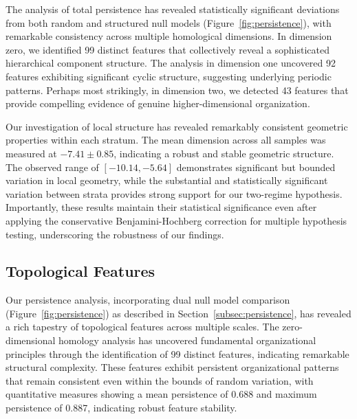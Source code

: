 The analysis of total persistence has revealed statistically significant deviations from both random and structured null models (Figure~\ref{fig:persistence}), with remarkable consistency across multiple homological dimensions. In dimension zero, we identified 99 distinct features that collectively reveal a sophisticated hierarchical component structure. The analysis in dimension one uncovered 92 features exhibiting significant cyclic structure, suggesting underlying periodic patterns. Perhaps most strikingly, in dimension two, we detected 43 features that provide compelling evidence of genuine higher-dimensional organization.

Our investigation of local structure has revealed remarkably consistent geometric properties within each stratum. The mean dimension across all samples was measured at $-7.41 \pm 0.85$, indicating a robust and stable geometric structure. The observed range of $[-10.14, -5.64]$ demonstrates significant but bounded variation in local geometry, while the substantial and statistically significant variation between strata provides strong support for our two-regime hypothesis. Importantly, these results maintain their statistical significance even after applying the conservative Benjamini-Hochberg correction for multiple hypothesis testing, underscoring the robustness of our findings.

\subsection{Topological Features}
\label{subsec:topological_features}

Our persistence analysis, incorporating dual null model comparison (Figure~\ref{fig:persistence}) as described in Section~\ref{subsec:persistence}, has revealed a rich tapestry of topological features across multiple scales. The zero-dimensional homology analysis has uncovered fundamental organizational principles through the identification of 99 distinct features, indicating remarkable structural complexity. These features exhibit persistent organizational patterns that remain consistent even within the bounds of random variation, with quantitative measures showing a mean persistence of 0.688 and maximum persistence of 0.887, indicating robust feature stability.

